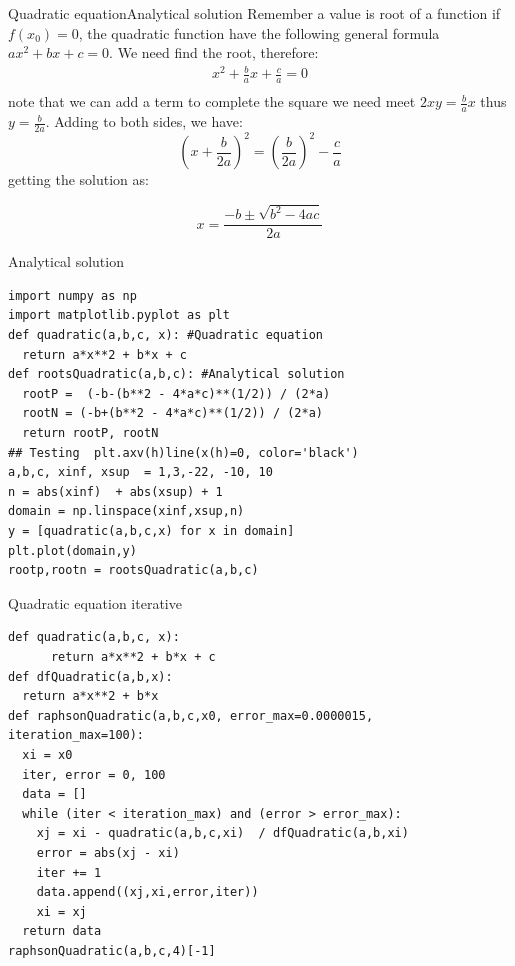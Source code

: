 \documentclass{beamer}
\begin{document}
\begin{frame}{Quadratic equation}{Analytical solution}
Remember a value is root of  a function if $f(x_{0}) = 0$, the quadratic function have the following general formula $ ax^{2} + bx + c = 0$.
We need find the root, therefore:
\begin{equation}
\begin{align*}
x^{2} + \frac{b}{a}x + \frac{c}{a} = 0 \\
\end{align*}
\end{equation}
note that we can add a term to complete the square we need meet $ 2xy = \frac{b}{a}x$ thus $y  = \frac{b}{2a}$. Adding to both sides, we have:
\begin{equation}
(x + \frac{b}{2a})^{2} = (\frac{b}{2a})^{2}  - \frac{c}{a}
\end{equation}
getting the solution as:

\begin{equation}
x  = \frac{-b \pm \sqrt{b^{2} - 4ac}}{2a} 
\end{equation}
\end{frame}


\begin{frame}[fragile]{Analytical solution}
\begin{lstlisting}
import numpy as np
import matplotlib.pyplot as plt
def quadratic(a,b,c, x): #Quadratic equation
  return a*x**2 + b*x + c
def rootsQuadratic(a,b,c): #Analytical solution
  rootP =  (-b-(b**2 - 4*a*c)**(1/2)) / (2*a)
  rootN = (-b+(b**2 - 4*a*c)**(1/2)) / (2*a)
  return rootP, rootN
## Testing  plt.axv(h)line(x(h)=0, color='black')
a,b,c, xinf, xsup  = 1,3,-22, -10, 10
n = abs(xinf)  + abs(xsup) + 1
domain = np.linspace(xinf,xsup,n)
y = [quadratic(a,b,c,x) for x in domain]
plt.plot(domain,y)
rootp,rootn = rootsQuadratic(a,b,c)
\end{lstlisting}

\end{frame}


\begin{frame}[fragile]{Quadratic equation iterative}
\begin{lstlisting}
def quadratic(a,b,c, x): 
      return a*x**2 + b*x + c
def dfQuadratic(a,b,x): 
  return a*x**2 + b*x
def raphsonQuadratic(a,b,c,x0, error_max=0.0000015, iteration_max=100):
  xi = x0
  iter, error = 0, 100
  data = []
  while (iter < iteration_max) and (error > error_max):
    xj = xi - quadratic(a,b,c,xi)  / dfQuadratic(a,b,xi)
    error = abs(xj - xi)
    iter += 1
    data.append((xj,xi,error,iter))
    xi = xj
  return data
raphsonQuadratic(a,b,c,4)[-1]
\end{lstlisting}
\end{frame}
\end{document}
